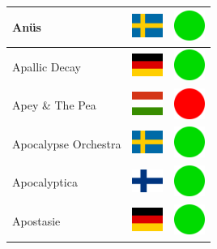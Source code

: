 \documentclass[12pt, a4paper, twoside]{report}
\begin{document}
\begin{center}
\begin{longtable}{|p{5cm}|p{2cm}|p{2cm}|}
 Anüs                                                       & \includegraphics[width=1cm]{../4x3/se} &   \includegraphics[width=1cm]{../likes/y} \\ \hline
 Apallic Decay                                              & \includegraphics[width=1cm]{../4x3/de} &   \includegraphics[width=1cm]{../likes/y} \\ \hline
 Apey \& The Pea                                            & \includegraphics[width=1cm]{../4x3/hu} &   \includegraphics[width=1cm]{../likes/n} \\ \hline
 Apocalypse Orchestra                                       & \includegraphics[width=1cm]{../4x3/se} &   \includegraphics[width=1cm]{../likes/y} \\ \hline
 Apocalyptica                                               & \includegraphics[width=1cm]{../4x3/fi} &   \includegraphics[width=1cm]{../likes/y} \\ \hline
 Apostasie                                                  & \includegraphics[width=1cm]{../4x3/de} &   \includegraphics[width=1cm]{../likes/y} \\ \hline

\end{longtable}
\end{center}
\end{document}
